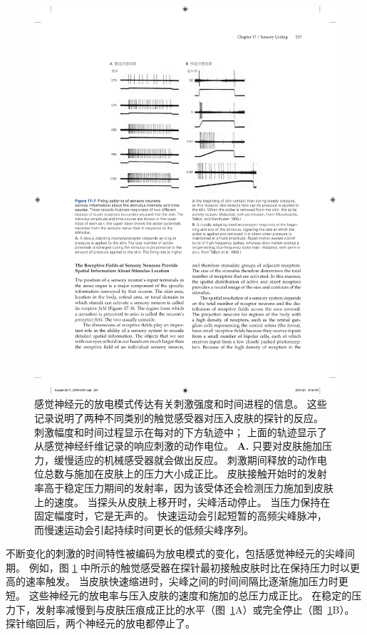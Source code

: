 \begin{figure}[htbp]
	\centering
	\includegraphics[width=1.0\linewidth]{chap17/fig_17_7}
	\caption{感觉神经元的放电模式传达有关刺激强度和时间进程的信息。
		这些记录说明了两种不同类别的触觉感受器对压入皮肤的探针的反应。 
		刺激幅度和时间过程显示在每对的下方轨迹中； 
		上面的轨迹显示了从感觉神经纤维记录的响应刺激的动作电位。 
		\textbf{A.} 只要对皮肤施加压力，缓慢适应的机械感受器就会做出反应。 
		刺激期间释放的动作电位总数与施加在皮肤上的压力大小成正比。
		皮肤接触开始时的发射率高于稳定压力期间的发射率，因为该受体还会检测压力施加到皮肤上的速度。 
		当探头从皮肤上移开时，尖峰活动停止\cite{mountcastle1966neural}。
		当压力保持在固定幅度时，它是无声的。 
		快速运动会引起短暂的高频尖峰脉冲，而慢速运动会引起持续时间更长的低频尖峰序列\cite{talbot1968sense}。}
	\label{fig:17_7}
\end{figure}


不断变化的刺激的时间特性被编码为放电模式的变化，包括感觉神经元的尖峰间期。
例如，图 \ref{fig:17_7} 中所示的触觉感受器在探针最初接触皮肤时比在保持压力时以更高的速率触发。
当皮肤快速缩进时，尖峰之间的时间间隔比逐渐施加压力时更短。
这些神经元的放电率与压入皮肤的速度和施加的总压力成正比。
在稳定的压力下，发射率减慢到与皮肤压痕成正比的水平（图~\ref{fig:17_7}A）或完全停止（图~\ref{fig:17_7}B）。 
探针缩回后，两个神经元的放电都停止了。


